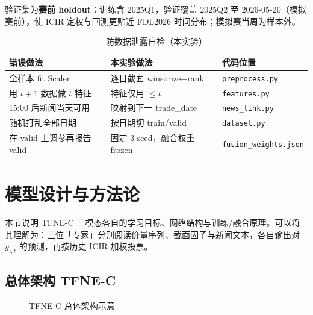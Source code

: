 \documentclass[UTF8,a4paper,12pt]{ctexart}
\begin{document}
验证集为\textbf{赛前 holdout}：训练含 2025Q1，验证覆盖 2025Q2 至 2026-05-20（模拟赛前），使 ICIR 定权与回测更贴近 FDL2026 时间分布；模拟赛当周为样本外。

\begin{table}[H]
\centering
\caption{防数据泄露自检（本实验）}
\label{tab:leak-check}
\small
\begin{tabular}{p{3.8cm}p{4cm}p{4.8cm}}
\toprule
\textbf{错误做法} & \textbf{本实验做法} & \textbf{代码位置} \\
\midrule
全样本 fit Scaler & 逐日截面 winsorize+rank & \texttt{preprocess.py} \\
用 $t\!+\!1$ 数据做 $t$ 特征 & 特征仅用 $\le t$ & \texttt{features.py} \\
15:00 后新闻当天可用 & 映射到下一 trade\_date & \texttt{news\_link.py} \\
随机打乱全部日期 & 按日期切 train/valid & \texttt{dataset.py} \\
在 valid 上调参再报告 valid & 固定 3 seed，融合权重 frozen & \texttt{fusion\_weights.json} \\
\bottomrule
\end{tabular}
\end{table}

\section{模型设计与方法论}

本节说明 TFNE-C 三模态各自的学习目标、网络结构与训练/融合原理。可以将其理解为：三位「专家」分别阅读价量序列、截面因子与新闻文本，各自输出对 $y_{i,t}$ 的预测，再按历史 ICIR 加权投票。

\subsection{总体架构 TFNE-C}

\begin{figure}[H]
\centering
{}
\caption{TFNE-C 总体架构示意}
\label{fig:arch-c}
\end{figure}
\end{document}
